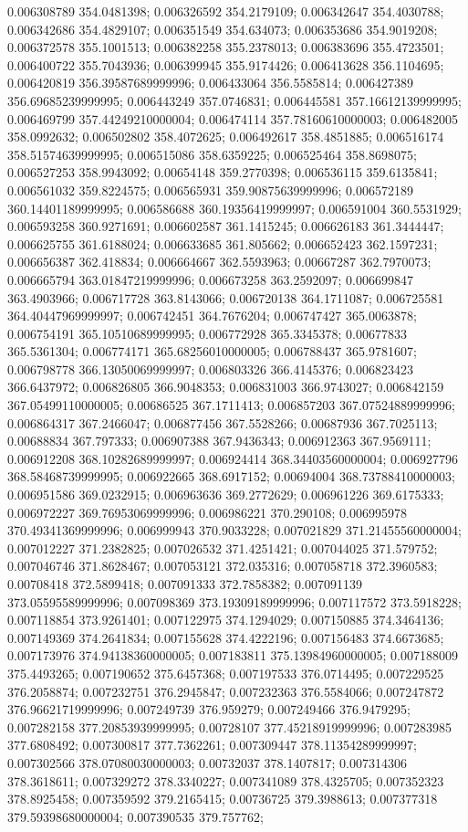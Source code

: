 0.006308789 354.0481398; 0.006326592 354.2179109; 0.006342647 354.4030788; 0.006342686 354.4829107; 0.006351549 354.634073; 0.006353686 354.9019208; 0.006372578 355.1001513; 0.006382258 355.2378013; 0.006383696 355.4723501; 0.006400722 355.7043936; 0.006399945 355.9174426; 0.006413628 356.1104695; 0.006420819 356.39587689999996; 0.006433064 356.5585814; 0.006427389 356.69685239999995; 0.006443249 357.0746831; 0.006445581 357.16612139999995; 0.006469799 357.44249210000004; 0.006474114 357.78160610000003; 0.006482005 358.0992632; 0.006502802 358.4072625; 0.006492617 358.4851885; 0.006516174 358.51574639999995; 0.006515086 358.6359225; 0.006525464 358.8698075; 0.006527253 358.9943092; 0.00654148 359.2770398; 0.006536115 359.6135841; 0.006561032 359.8224575; 0.006565931 359.90875639999996; 0.006572189 360.14401189999995; 0.006586688 360.19356419999997; 0.006591004 360.5531929; 0.006593258 360.9271691; 0.006602587 361.1415245; 0.006626183 361.3444447; 0.006625755 361.6188024; 0.006633685 361.805662; 0.006652423 362.1597231; 0.006656387 362.418834; 0.006664667 362.5593963; 0.00667287 362.7970073; 0.006665794 363.01847219999996; 0.006673258 363.2592097; 0.006699847 363.4903966; 0.006717728 363.8143066; 0.006720138 364.1711087; 0.006725581 364.40447969999997; 0.006742451 364.7676204; 0.006747427 365.0063878; 0.006754191 365.10510689999995; 0.006772928 365.3345378; 0.00677833 365.5361304; 0.006774171 365.68256010000005; 0.006788437 365.9781607; 0.006798778 366.13050069999997; 0.006803326 366.4145376; 0.006823423 366.6437972; 0.006826805 366.9048353; 0.006831003 366.9743027; 0.006842159 367.05499110000005; 0.00686525 367.1711413; 0.006857203 367.07524889999996; 0.006864317 367.2466047; 0.006877456 367.5528266; 0.00687936 367.7025113; 0.00688834 367.797333; 0.006907388 367.9436343; 0.006912363 367.9569111; 0.006912208 368.10282689999997; 0.006924414 368.34403560000004; 0.006927796 368.58468739999995; 0.006922665 368.6917152; 0.00694004 368.73788410000003; 0.006951586 369.0232915; 0.006963636 369.2772629; 0.006961226 369.6175333; 0.006972227 369.76953069999996; 0.006986221 370.290108; 0.006995978 370.49341369999996; 0.006999943 370.9033228; 0.007021829 371.21455560000004; 0.007012227 371.2382825; 0.007026532 371.4251421; 0.007044025 371.579752; 0.007046746 371.8628467; 0.007053121 372.035316; 0.007058718 372.3960583; 0.00708418 372.5899418; 0.007091333 372.7858382; 0.007091139 373.05595589999996; 0.007098369 373.19309189999996; 0.007117572 373.5918228; 0.007118854 373.9261401; 0.007122975 374.1294029; 0.007150885 374.3464136; 0.007149369 374.2641834; 0.007155628 374.4222196; 0.007156483 374.6673685; 0.007173976 374.94138360000005; 0.007183811 375.13984960000005; 0.007188009 375.4493265; 0.007190652 375.6457368; 0.007197533 376.0714495; 0.007229525 376.2058874; 0.007232751 376.2945847; 0.007232363 376.5584066; 0.007247872 376.96621719999996; 0.007249739 376.959279; 0.007249466 376.9479295; 0.007282158 377.20853939999995; 0.00728107 377.45218919999996; 0.007283985 377.6808492; 0.007300817 377.7362261; 0.007309447 378.11354289999997; 0.007302566 378.07080030000003; 0.00732037 378.1407817; 0.007314306 378.3618611; 0.007329272 378.3340227; 0.007341089 378.4325705; 0.007352323 378.8925458; 0.007359592 379.2165415; 0.00736725 379.3988613; 0.007377318 379.59398680000004; 0.007390535 379.757762; 
